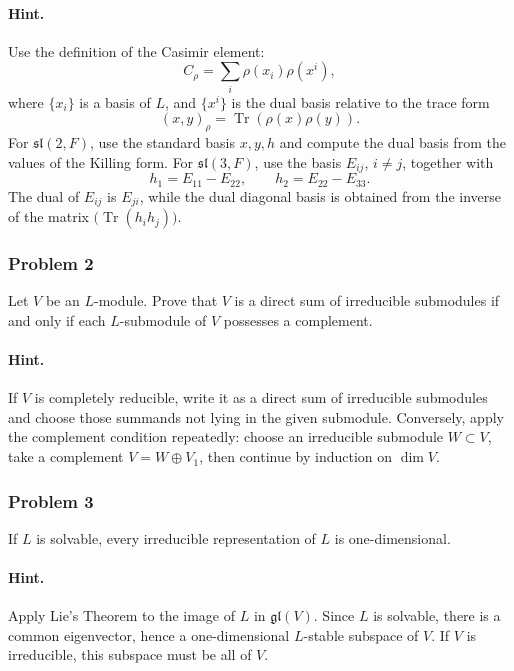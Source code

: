 \documentclass[12pt, a4paper]{article}
\begin{document}
\paragraph{Hint.}
Use the definition of the Casimir element:
\[
C_\rho=\sum_i \rho(x_i)\rho(x^i),
\]
where \(\{x_i\}\) is a basis of \(L\), and \(\{x^i\}\) is the dual basis
relative to the trace form
\[
(x,y)_\rho=\operatorname{Tr}(\rho(x)\rho(y)).
\]
For \(\mathfrak{sl}(2,F)\), use the standard basis \(x,y,h\) and compute the
dual basis from the values of the Killing form. For \(\mathfrak{sl}(3,F)\), use
the basis \(E_{ij}\), \(i\neq j\), together with
\[
h_1=E_{11}-E_{22},\qquad h_2=E_{22}-E_{33}.
\]
The dual of \(E_{ij}\) is \(E_{ji}\), while the dual diagonal basis is obtained
from the inverse of the matrix \(\bigl(\operatorname{Tr}(h_i h_j)\bigr)\).

\subsubsection{Problem 2}

Let \(V\) be an \(L\)-module. Prove that \(V\) is a direct sum of irreducible
submodules if and only if each \(L\)-submodule of \(V\) possesses a complement.

\paragraph{Hint.}
If \(V\) is completely reducible, write it as a direct sum of irreducible
submodules and choose those summands not lying in the given submodule. Conversely,
apply the complement condition repeatedly: choose an irreducible submodule
\(W\subset V\), take a complement \(V=W\oplus V_1\), then continue by induction
on \(\dim V\).

\subsubsection{Problem 3}

If \(L\) is solvable, every irreducible representation of \(L\) is
one-dimensional.

\paragraph{Hint.}
Apply Lie's Theorem to the image of \(L\) in \(\mathfrak{gl}(V)\). Since \(L\)
is solvable, there is a common eigenvector, hence a one-dimensional
\(L\)-stable subspace of \(V\). If \(V\) is irreducible, this subspace must be
all of \(V\).
\end{document}
